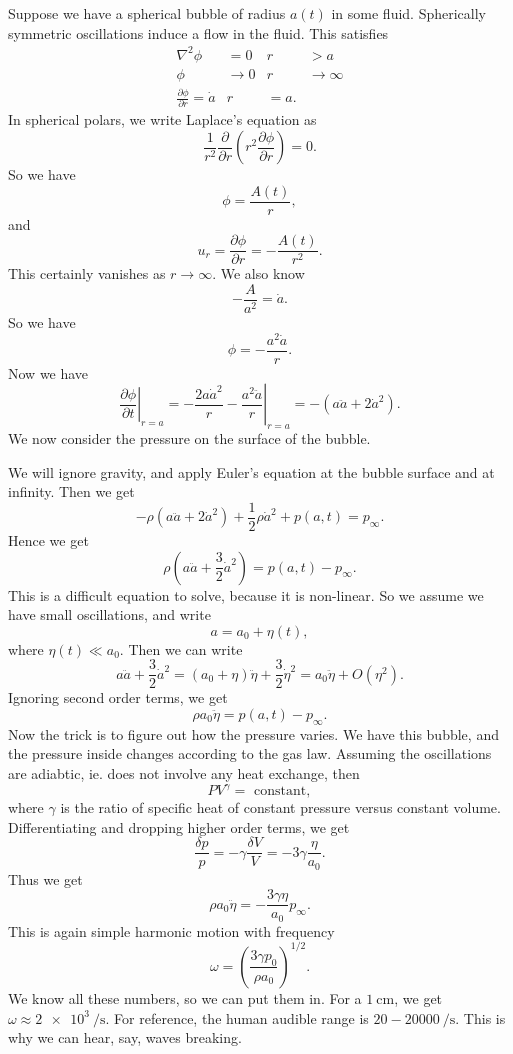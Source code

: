 \documentclass[a4paper]{article}
\begin{document}
\begin{eg}
  Suppose we have a spherical bubble of radius $a(t)$ in some fluid. Spherically symmetric oscillations induce a flow in the fluid. This satisfies
  \begin{align*}
    \nabla^2 \phi &= 0 & r & > a\\
    \phi&\to 0 & r &\to \infty\\
    \frac{\partial \phi}{\partial r} = \dot{a} & r &= a.
  \end{align*}
  In spherical polars, we write Laplace's equation as
  \[
    \frac{1}{r^2} \frac{\partial}{\partial r} \left(r^2 \frac{\partial \phi}{\partial r}\right) = 0.
  \]
  So we have
  \[
    \phi = \frac{A(t)}{r},
  \]
  and
  \[
    u_r = \frac{\partial \phi}{\partial r} = -\frac{A(t)}{r^2}.
  \]
  This certainly vanishes as $r \to \infty$. We also know
  \[
    -\frac{A}{a^2} = \dot{a}.
  \]
  So we have
  \[
    \phi = -\frac{a^2\dot{a}}{r}.
  \]
  Now we have
  \[
    \left.\frac{\partial \phi}{\partial t}\right|_{r = a} = \left.-\frac{2a\dot{a}^2}{r} -\frac{a^2\ddot{a}}{r}\right|_{r = a} = -(a\ddot{a} + 2\dot{a}^2).
  \]
  We now consider the pressure on the surface of the bubble.

  We will ignore gravity, and apply Euler's equation at the bubble surface and at infinity. Then we get
  \[
    -\rho (a\ddot{a} + 2 \dot{a}^2) + \frac{1}{2}\rho \dot{a}^2 + p(a, t) = p_\infty.
  \]
  Hence we get
  \[
    \rho\left(a\ddot{a} + \frac{3}{2}\dot{a}^2\right) = p(a, t) - p_\infty.
  \]
  This is a difficult equation to solve, because it is non-linear. So we assume we have small oscillations, and write
  \[
    a = a_0 + \eta(t),
  \]
  where $\eta(t) \ll a_0$. Then we can write
  \[
    a\ddot{a} + \frac{3}{2} \dot{a}^2 = (a_0 + \eta) \ddot{\eta} + \frac{3}{2} \dot{\eta}^2 = a_0 \ddot{\eta} + O(\eta^2).
  \]
  Ignoring second order terms, we get
  \[
    \rho a_0 \ddot{\eta} = p(a, t) - p_\infty.
  \]
  Now the trick is to figure out how the pressure varies. We have this bubble, and the pressure inside changes according to the gas law. Assuming the oscillations are adiabtic, ie. does not involve any heat exchange, then
  \[
    PV^\gamma =\text{ constant},
  \]
  where $\gamma$ is the ratio of specific heat of constant pressure versus constant volume. Differentiating and dropping higher order terms, we get
  \[
    \frac{\delta p}{p} = -\gamma \frac{\delta V}{V} = -3\gamma \frac{\eta}{a_0}.
  \]
  Thus we get
  \[
    \rho a_0 \ddot{\eta} = -\frac{3 \gamma \eta}{a_0} p_\infty.
  \]
  This is again simple harmonic motion with frequency
  \[
    \omega = \left(\frac{3\gamma p_0}{\rho a_0}\right)^{1/2}.
  \]
  We know all these numbers, so we can put them in. For a $\SI{1}{\centi\meter}$, we get $\omega \approx \SI{2e3}{\per\second}$. For reference, the human audible range is $20 - \SI{20000}{\per\second}$. This is why we can hear, say, waves breaking.
\end{eg}
\end{document}
